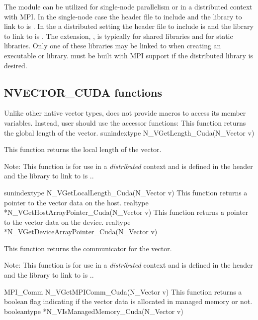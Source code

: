 The {\nveccuda} module can be utilized for single-node parallelism or in a
distributed context with MPI. In the single-node case the header file to
include  and the library to link to is
. In the a distributed setting the header
file to include is  and the library to link to is
. The extension, , is
typically  for shared libraries and  for static libraries.
Only one of these libraries may be linked to when creating an executable
or library. {\sundials} must be built with MPI support if the distributed
library is desired. 


\subsection{NVECTOR\_CUDA functions}
\label{ss:nvec_cuda_functions}

Unlike other native {\sundials} vector types, {\nveccuda} does not provide macros
to access its member variables. Instead, user should use the accessor functions:
{
  This function returns the global length of the vector.
}
{
  sunindextype N\_VGetLength\_Cuda(N\_Vector v)
}
{
  This function returns the local length of the vector.
  
  Note: This function is for use in a \textit{distributed} context and
  is defined in the header  and the library
  to link to is ..
}
{
  sunindextype N\_VGetLocalLength\_Cuda(N\_Vector v)
}
{
  This function returns a pointer to the vector data on the host.
}
{
  realtype *N\_VGetHostArrayPointer\_Cuda(N\_Vector v)
}
{
  This function returns a pointer to the vector data on the device.
}
{
  realtype *N\_VGetDeviceArrayPointer\_Cuda(N\_Vector v)
}
{
  This function returns the {\mpi} communicator for the vector.

  Note: This function is for use in a \textit{distributed} context
  and is defined in the header  and the
  library to link to is ..
}
{
  MPI\_Comm N\_VGetMPIComm\_Cuda(N\_Vector v)
}
{
  This function returns a boolean flag indicating if the vector
  data is allocated in managed memory or not.
}
{
  booleantype *N\_VIsManagedMemory\_Cuda(N\_Vector v)
}

